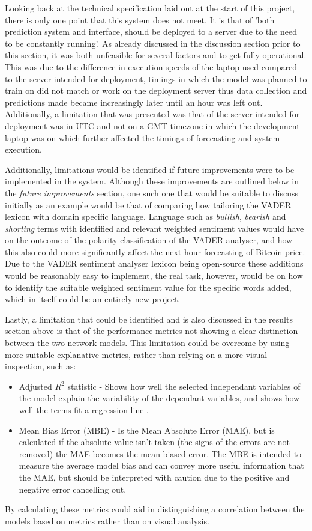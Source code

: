 \documentclass[oneside, 12pt]{article}
\begin{document}
	Looking back at the technical specification laid out at the start of this project, there is only one point that this system does not meet. It is that of 'both prediction system and interface, should be deployed to a server due to the need to be constantly running'. As already discussed in the discussion section prior to this section, it was both unfeasible for several factors and to get fully operational. This was due to the difference in execution speeds of the laptop used compared to the server intended for deployment, timings in which the model was planned to train on did not match or work on the deployment server thus data collection and predictions made became increasingly later until an hour was left out. Additionally, a limitation that was presented was that of the server intended for deployment was in UTC and not on a GMT timezone in which the development laptop was on which further affected the timings of forecasting and system execution. 
	
	Additionally, limitations would be identified if future improvements were to be implemented in the system. Although these improvements are outlined below in the \textit{future improvements} section, one such one that would be suitable to discuss initially as an example would be that of comparing how tailoring the VADER lexicon with domain specific language. Language such as \textit{bullish}, \textit{bearish} and \textit{shorting} terms with identified and relevant weighted sentiment values would have on the outcome of the polarity classification of the VADER analyser, and how this also could more significantly affect the next hour forecasting of Bitcoin price. Due to the VADER sentiment analyser lexicon being open-source these additions would be reasonably easy to implement, the real task, however, would be on how to identify the suitable weighted sentiment value for the specific words added, which in itself could be an entirely new project.
	
	Lastly, a limitation that could be identified and is also discussed in the results section above is that of the performance metrics not showing a clear distinction between the two network models. This limitation could be overcome by using more suitable explanative metrics, rather than relying on a more visual inspection, such as: 
	\begin{itemize}
		\item Adjusted $R^2$ statistic - Shows how well the selected independant variables of the model explain the variability of the dependant variables, and shows how well the terms fit a regression line \cite{RMSEMAE}. 
		\item Mean Bias Error (MBE) - Is the Mean Absolute Error (MAE), but is calculated if the absolute value isn't taken (the signs of the errors are not removed) the MAE becomes the mean biased error. The MBE is intended to measure the average model bias and can convey more useful information that the MAE, but should be interpreted with caution due to the positive and negative error cancelling out. \cite{MBE}
	\end{itemize}
	By calculating these metrics could aid in distinguishing a correlation between the models based on metrics rather than on visual analysis.
	
\end{document}
